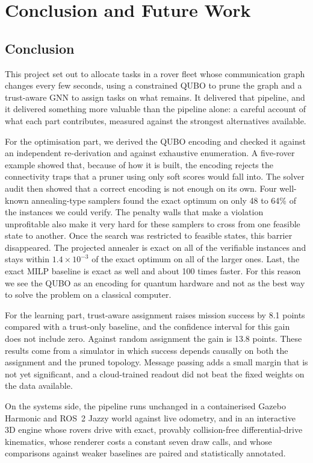 \chapter{Conclusion and Future Work}
\label{ch:conclusion}

\section{Conclusion}

This project set out to allocate tasks in a rover fleet whose communication
graph changes every few seconds, using a constrained QUBO to prune the graph
and a trust-aware GNN to assign tasks on what remains. It delivered that
pipeline, and it delivered something more valuable than the pipeline alone:
a careful account of what each part contributes, measured against the
strongest alternatives available.

For the optimisation part, we derived the QUBO encoding and checked it
against an independent re-derivation and against exhaustive enumeration. A
five-rover example showed that, because of how it is built, the encoding
rejects the connectivity traps that a pruner using only soft scores would
fall into. The solver audit then showed that a correct encoding is not
enough on its own. Four well-known annealing-type samplers found the exact
optimum on only 48 to 64\% of the instances we could verify. The penalty
walls that make a violation unprofitable also make it very hard for these
samplers to cross from one feasible state to another. Once the search was
restricted to feasible states, this barrier disappeared. The projected
annealer is exact on all of the verifiable instances and stays within
$1.4\times10^{-3}$ of the exact optimum on all of the larger ones. Last, the
exact MILP baseline is exact as well and about 100 times faster. For this
reason we see the QUBO as an encoding for quantum hardware and not as the
best way to solve the problem on a classical computer.

For the learning part, trust-aware assignment raises mission success by 8.1
points compared with a trust-only baseline, and the confidence interval for
this gain does not include zero. Against random assignment the gain is 13.8
points. These results come from a simulator in which success depends causally
on both the assignment and the pruned topology. Message passing adds a small margin that is not yet significant,
and a cloud-trained readout did not beat the fixed weights on the data
available.

On the systems side, the pipeline runs unchanged in a containerised Gazebo
Harmonic and ROS~2 Jazzy world against live odometry, and in an interactive
3D engine whose rovers drive with exact, provably collision-free
differential-drive kinematics, whose renderer costs a constant seven draw
calls, and whose comparisons against weaker baselines are paired and
statistically annotated.

